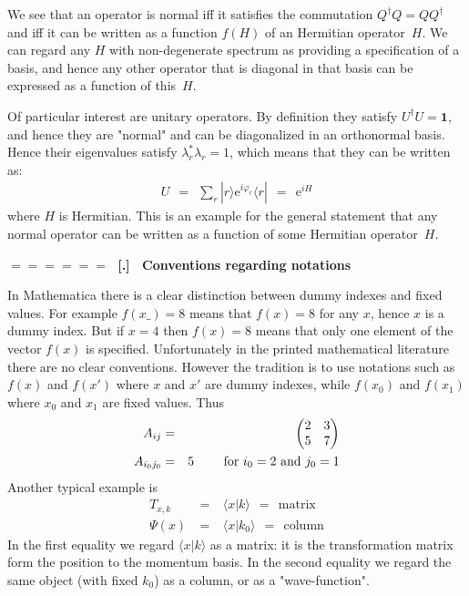 \documentclass[onecolumn,fleqn]{revtex4}
\newcommand{\eexp}{\mathrm{e}^}
\newcommand{\amatrix}[1]{\begin{matrix} #1 \end{matrix}}
\newcommand{\beq}{\begin{eqnarray}}
\newcommand{\eeq}{\end{eqnarray}}
\renewcommand{\thesubsection}{\arabic{subsection}}
\renewcommand{\thesubsubsection}{\arabic{subsubsection}}
\newcommand{\sheadC}[1]
{
\addtocounter{subsubsection}{1}
\vspace{5mm}
{\Large\bf $=\!=\!=\!=\!=\!=\;$ [\thesubsection.\thesubsubsection] \ #1}  
\nopagebreak
\phantomsection
}
\begin{document}
We see that an operator is normal iff it satisfies the 
commutation ${Q^{\dagger}Q=QQ^{\dagger}}$ and iff it 
can be written as a function $f(H)$ of an Hermitian operator~$H$.     
We can regard any $H$ with non-degenerate 
spectrum as providing a specification of a basis, 
and hence any other operator that is diagonal in that basis 
can be expressed as a function of this~$H$.  


Of particular interest are unitary operators. 
By definition they satisfy ${U^{\dagger}U=\mathbf{1}}$, 
and hence they are "normal" and can be diagonalized in an orthonormal basis. 
Hence their eigenvalues satisfy ${\lambda_{r}^{*}\lambda _{r}=1}$, 
which means that they can be written as:
\beq
U \ \ = \ \ \sum_{r} |r \rangle \eexp{ i \varphi_{r}} \langle r| \ \ = \ \ \eexp{iH}
\eeq
where $H$ is Hermitian. This is an example for the general 
statement that any normal operator can be written as a function 
of some Hermitian operator~$H$. 


\sheadC{Conventions regarding notations} 

In Mathematica there is a clear distinction between   
dummy indexes and fixed values. For example $f( x\_ )=8$ 
means that $f(x)=8$ for any $x$, hence $x$ is a dummy index.   
But if $x=4$ then $f(x)=8$ means that only one element 
of the vector $f(x)$ is specified.  Unfortunately  in the 
printed mathematical literature there are no clear conventions. 
However the tradition is to use notations such 
as $f(x)$ and $f(x')$ where $x$ and $x'$ are dummy indexes,  
while $f(x_0)$ and $f(x_1)$ where $x_0$ and $x_1$ are fixed values.   
Thus 
\beq
A_{ij} &=& \left(\amatrix{2 & 3 \cr 5 & 7}\right) 
\\ \nonumber
A_{i_0j_0} &=& 5  \ \ \ \ \ \ \ \mbox{for $i_0=2$ and $j_0=1$}
\eeq
Another typical example is 
\beq
T_{x,k} \ &=& \  \langle x | k \rangle \ \ = \ \ \text{matrix}
\\
\Psi(x) \ &=& \ \langle x | k_0 \rangle \ \ = \ \ \text{column}
\eeq
In the first equality we regard $\langle x | k \rangle$ 
as a matrix: it is the transformation matrix form the 
position to the momentum basis. In the second equality 
we regard the same object (with fixed $k_0$) as a column, 
or as a "wave-function". 
\end{document}
